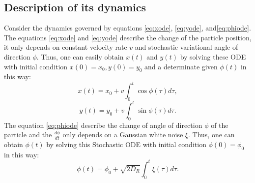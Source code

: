 \documentclass[runningheads]{llncs}
\begin{document}
\subsection{Description of its dynamics}
Consider the dynamics governed by equations \eqref{eq:xode}, \eqref{eq:yode}, and\eqref{eq:phiode}.\\
The equations \eqref{eq:xode} and \eqref{eq:yode} describe the change of the particle position,
it only depends on constant velocity rate $v$ and stochastic variational angle of direction $\phi$.
Thus, one can easily obtain $x(t)$ and $y(t)$ by solving these ODE with initial condition $x(0)=x_0, y(0)=y_0$ and a determinate given $\phi(t)$ in this way:
$$
    x(t)=x_0+v\int_0^t\cos\phi(\tau)d\tau,
$$
$$
    y(t)=y_0+v\int_0^t\sin\phi(\tau)d\tau.
$$
The equation \eqref{eq:phiode} describe the change of angle of direction $\phi$ of the particle
and the $\frac{d\phi}{dt}$ only depends on a Gaussian white noise $\xi$.
Thus, one can obtain $\phi(t)$ by solving this Stochastic ODE with initial condition $\phi(0)=\phi_0$ in this way:
$$
    \phi(t)=\phi_0+\sqrt{2D_R}\int_0^t\xi(\tau)d\tau.
$$
\end{document}

